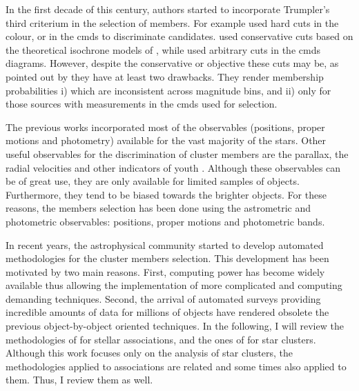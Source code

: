 In the first decade of this century, authors started to incorporate Trumpler's third criterium in the selection of members. For example \citet{2003A&A...400..891M, 2004A&A...416..125D,2007A&A...470..585B,Lodieu2012} used hard cuts in the colour, or in the \glspl{cmd} to discriminate candidates. \citet{2003A&A...400..891M} used conservative cuts based on the theoretical isochrone models of \citet{1998A&A...337..403B}, while \citet{2004A&A...416..125D,2007A&A...470..585B,Lodieu2012} used arbitrary cuts in the \glspl{cmd} diagrams. However, despite the conservative or objective these cuts may be, as pointed out by \citet{Sarro2014} they have at least two drawbacks. They render membership probabilities i) which are inconsistent across magnitude bins, and ii) only for those sources with measurements in the \glspl{cmd} used for selection.
  
The previous works incorporated most of the observables (positions, proper motions and photometry) available for the vast majority of the stars. Other useful observables for the discrimination of cluster members are the parallax, the radial velocities and other indicators of youth \cite[e.g. lithium abundance, photospheric activity, rotation, see for example][]{2016A&A...596A.113B}.  Although these observables can be of great use, they are only available for limited samples of objects. Furthermore, they tend to be biased towards the brighter objects. For these reasons, the members selection has been done using the astrometric and photometric observables: positions, proper motions and photometric bands.

In recent years, the astrophysical community started to develop automated methodologies for the cluster members selection. This development has been motivated by two main reasons. First, computing power has become widely available thus allowing the implementation of more complicated and computing demanding techniques. Second, the arrival of automated surveys providing incredible amounts of data for millions of objects have rendered obsolete the previous object-by-object oriented techniques. In the following, I will review the methodologies of \citet{Malo2013,Gagne2014,Riedel2017} for stellar associations, and the ones of \citet{KroneMartins2014,Sarro2014,Sampedro2016} for star clusters. Although this work focuses only on the analysis of star clusters, the methodologies applied to associations are related and some times also applied to them. Thus, I review them as well.

